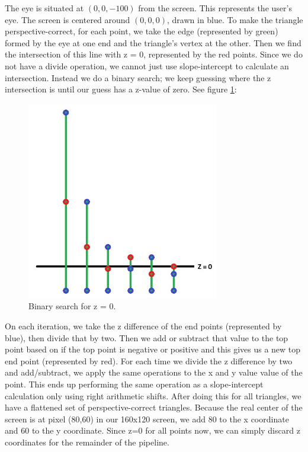 \documentclass[onecolumn]{IEEEtran}
\begin{document}
The eye is situated at $(0,0,-100)$ from the screen.  This represents the user's eye.  The screen is centered around $(0,0,0)$, drawn in blue.  To make the triangle perspective-correct, for each point, we take the edge (represented by green) formed by the eye at one end and the triangle's vertex at the other.  Then we find the intersection of this line with z = 0, represented by the red points.  Since we do not have a divide operation, we cannot just use slope-intercept to calculate an intersection.  Instead we do a binary search; we keep guessing where the z intersection is until our guess has a z-value of zero.  See figure \ref{fig:binarySearch}:

\begin{figure}[H]
	\centering
	\includegraphics[width=0.75\textwidth]{binarySearch.png}
	\caption{Binary search for z = 0.}
	\label{fig:binarySearch}
\end{figure}

On each iteration, we take the z difference of the end points (represented by blue), then divide that by two.  Then we add or subtract that value to the top point based on if the top point is negative or positive and this gives us a new top end point (represented by red).  For each time we divide the z difference by two and add/subtract, we apply the same operations to the x and y value value of the point.  This ends up performing the same operation as a slope-intercept calculation only using right arithmetic shifts.  After doing this for all triangles, we have a flattened set of perspective-correct triangles.  Because the real center of the screen is at pixel (80,60) in our 160x120 screen, we add 80 to the x coordinate and 60 to the y coordinate.  Since z=0 for all points now, we can simply discard z coordinates for the remainder of the pipeline.
\end{document}

